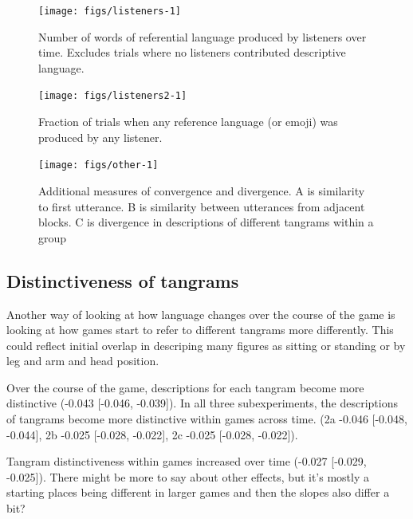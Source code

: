 \documentclass[
  english,
  a4paper,
]{article}
\begin{document}
\begin{figure}[t!]

{\centering \texttt{[image: figs/listeners-1]} 

}

\caption{Number of words of referential language produced by listeners over time. Excludes trials where no listeners contributed descriptive language.  }\label{fig:listeners}
\end{figure}

\begin{figure}[t!]

{\centering \texttt{[image: figs/listeners2-1]} 

}

\caption{Fraction of trials when any reference language (or emoji) was produced by any listener.}\label{fig:listeners2}
\end{figure}

\begin{figure}[t!]

{\centering \texttt{[image: figs/other-1]} 

}

\caption{Additional measures of convergence and divergence. A is similarity to first utterance. B is similarity between utterances from adjacent blocks. C is divergence in descriptions of different tangrams within a group}\label{fig:other}
\end{figure}

\hypertarget{distinctiveness-of-tangrams}{%
\subsection{Distinctiveness of tangrams}\label{distinctiveness-of-tangrams}}

Another way of looking at how language changes over the course of the game is looking at how games start to refer to different tangrams more differently. This could reflect initial overlap in descriping many figures as sitting or standing or by leg and arm and head position.

Over the course of the game, descriptions for each tangram become more distinctive (-0.043 {[}-0.046, -0.039{]}).
In all three subexperiments, the descriptions of tangrams become more distinctive within games across time. (2a -0.046 {[}-0.048, -0.044{]}, 2b -0.025 {[}-0.028, -0.022{]}, 2c -0.025 {[}-0.028, -0.022{]}).

Tangram distinctiveness within games increased over time (-0.027 {[}-0.029, -0.025{]}). There might be more to say about other effects, but it's mostly a starting places being different in larger games and then the slopes also differ a bit?
\end{document}
